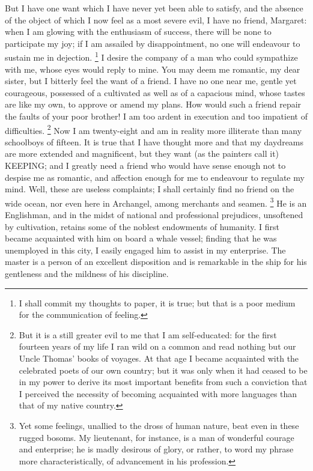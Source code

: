 But I have one want which I have never yet been able to satisfy, and the absence of the object of which I now feel as a most severe evil, I have no friend, Margaret: when I am glowing with the enthusiasm of success, there will be none to participate my joy; if I am assailed by disappointment, no one will endeavour to sustain me in dejection. 
\footnote{I shall commit my thoughts to paper, it is true; but that is a poor medium for the communication of feeling.}
I desire the company of a man who could sympathize with me, whose eyes would reply to mine. You may deem me romantic, my dear sister, but I bitterly feel the want of a friend. I have no one near me, gentle yet courageous, possessed of a cultivated as well as of a capacious mind, whose tastes are like my own, to approve or amend my plans. How would such a friend repair the faults of your poor brother! I am too ardent in execution and too impatient of difficulties.
\footnote{But it is a still greater evil to me that I am self-educated: for the first fourteen years of my life I ran wild on a common and read nothing but our Uncle Thomas' books of voyages. At that age I became acquainted with the celebrated poets of our own country; but it was only when it had ceased to be in my power to derive its most important benefits from such a conviction that I perceived the necessity of becoming acquainted with more languages than that of my native country.}
Now I am twenty-eight and am in reality more illiterate than many schoolboys of fifteen. It is true that I have thought more and that my daydreams are more extended and magnificent, but they want (as the painters call it) KEEPING; and I greatly need a friend who would have sense enough not to despise me as romantic, and affection enough for me to endeavour to regulate my mind. Well, these are useless complaints; I shall certainly find no friend on the wide ocean, nor even here in Archangel, among merchants and seamen.
\footnote{Yet some feelings, unallied to the dross of human nature, beat even in these rugged bosoms. My lieutenant, for instance, is a man of wonderful courage and enterprise; he is madly desirous of glory, or rather, to word my phrase more characteristically, of advancement in his profession.}
He is an Englishman, and in the midst of national and professional prejudices, unsoftened by cultivation, retains some of the noblest endowments of humanity. I first became acquainted with him on board a whale vessel; finding that he was unemployed in this city, I easily engaged him to assist in my enterprise. The master is a person of an excellent disposition and is remarkable in the ship for his gentleness and the mildness of his discipline.
